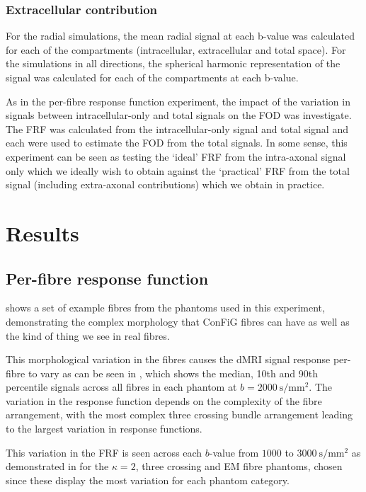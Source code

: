 \subsubsection{Extracellular contribution}
\label{sec:frf_sig_proc_extra}
For the radial simulations, the mean radial signal at each b-value was calculated for each of the compartments (intracellular, extracellular and total space). For the simulations in all directions, the spherical harmonic representation of the signal was calculated for each of the compartments at each b-value.

As in the per-fibre response function experiment, the impact of the variation in signals between intracellular-only and total signals on the \ac{FOD} was investigate. The \ac{FRF} was calculated from the intracellular-only signal and total signal and each were used to estimate the \ac{FOD} from the total signals. In some sense, this experiment can be seen as testing the `ideal' \ac{FRF} from the intra-axonal signal only which we ideally wish to obtain against the `practical' \ac{FRF} from the total signal (including extra-axonal contributions) which we obtain in practice.


\section{Results}
\label{sec:frf_results}


\subsection{Per-fibre response function}
\label{sec:frf_res_per_fibre}
 shows a set of example fibres from the phantoms used in this experiment, demonstrating the complex morphology that ConFiG fibres can have as well as the kind of thing we see in real fibres.

This morphological variation in the fibres causes the \ac{dMRI} signal response per-fibre to vary as can be seen in , which shows the median, 10th and 90th percentile signals across all fibres in each phantom at $b=\SI{2000}{\second\per\milli\metre\squared}$.
The variation in the response function depends on the complexity of the fibre arrangement, with the most complex three crossing bundle arrangement leading to the largest variation in response functions.

This variation in the \ac{FRF} is seen across each $b$-value from $1000$ to $\SI{3000}{\second\per\milli\metre\squared}$ as demonstrated in  for the $\kappa=2$, three crossing and EM fibre phantoms, chosen since these display the most variation for each phantom category.


